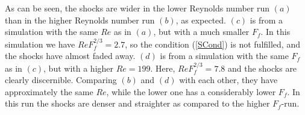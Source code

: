 As can be seen, the shocks are wider in the lower Reynolds number run $(a)$
than in the higher Reynolds number run $(b)$, as expected. $(c)$
is from a simulation with the same $ Re $ as in $(a)$, but with a much smaller
$ F_f $. In this simulation we have $ Re F_f^{2/3} = 2.7 $, so the condition
(\ref{SCond}) is not fulfilled, and the
shocks have almost faded away. $(d)$ is from a simulation with
the same $ F_f $ as in $(c)$, but with a higher $ Re = 199 $.
Here, $ Re F_f^{2/3} = 7.8 $ and  the shocks are clearly discernible. {
Comparing $(b)$ and $(d)$ with each other, they have approximately the same
$ Re $, while the lower one has a considerably lower $ F_f $.  In this run the
shocks are denser and straighter as compared to the higher $ F_f $-run.}



% 
% 
%
% 
